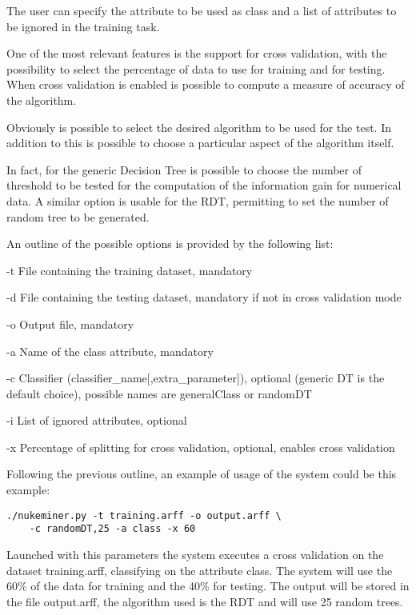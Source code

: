 \documentclass{acm_proc_article-sp-sigmod07}
\begin{document}
The user can specify the attribute to be used as class and a list of
attributes to be ignored in the training task.

One of the most relevant features is the support for cross validation,
with the possibility to select the percentage of data to use for training
and for testing.
When cross validation is enabled is possible to compute a measure of
accuracy of the algorithm. 

Obviously is possible to select the desired algorithm to be used for the
test. In addition to this is possible to choose a particular aspect of the
algorithm itself.

In fact, for the generic Decision Tree is possible to choose the number of
threshold to be tested for the computation of the information gain for
numerical data.
A similar option is usable for the RDT, permitting to set the number of
random tree to be generated.

An outline of the possible options is provided by the following list:
\begin{description}
\item{-t} File containing the training dataset, mandatory
\item{-d} File containing the testing dataset, mandatory if not in cross
validation mode
\item{-o} Output file, mandatory
\item{-a} Name of the class attribute, mandatory
\item{-c} Classifier (classifier\_name[,extra\_parameter]), optional
(generic DT is the default choice), possible names are generalClass or
randomDT
\item{-i} List of ignored attributes, optional
\item{-x} Percentage of splitting for cross validation, optional, enables
cross validation
\end{description}
	
Following the previous outline, an example of usage of the system could be
this example:
\begin{verbatim}
./nukeminer.py -t training.arff -o output.arff \
    -c randomDT,25 -a class -x 60
\end{verbatim}

Launched with this parameters the system executes a cross validation on
the dataset training.arff, classifying on the attribute class. The system
will use the 60\% of the data for training and the 40\% for testing. The
output will be stored in the file output.arff, the algorithm used is the
RDT and will use 25 random trees.
\end{document}
